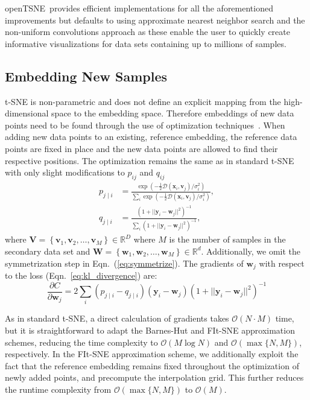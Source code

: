 \documentclass[twocolumn]{bmcart}
\newcommand{\opentsne}{\textsf{openTSNE}}
\begin{document}
\opentsne\ provides efficient implementations for all the aforementioned improvements but defaults to using approximate nearest neighbor search and the non-uniform convolutions approach as these enable the user to quickly create informative visualizations for data sets containing up to millions of samples.

\subsection*{Embedding New Samples}

t-SNE is non-parametric and does not define an explicit mapping from the high-dimensional space to the embedding space. Therefore embeddings of new data points need to be found through the use of optimization techniques~\cite{policar2019embedding}. When adding new data points to an existing, reference embedding, the reference data points are fixed in place and the new data points are allowed to find their respective positions. The optimization remains the same as in standard t-SNE with only slight modifications to $p_{ij}$ and $q_{ij}$
\begin{align}
p_{j \mid i} &= \frac{\exp \left ( -\frac{1}{2} \mathcal{D}(\mathbf{x}_i, \mathbf{v}_j) /  \sigma_i^2 \right )}{\sum_{i} \exp \left ( -\frac{1}{2} \mathcal{D}(\mathbf{x}_i, \mathbf{v}_j) / \sigma_i^2 \right )}, \\
q_{j \mid i} &= \frac{\left ( 1 + || \mathbf{y}_i - \mathbf{w}_j ||^2 \right )^{-1}}{\sum_{i}\left ( 1 + || \mathbf{y}_i - \mathbf{w}_j ||^2 \right )^{-1}},
\end{align}
\noindent where $\mathbf{V} = \left \{ \mathbf{v}_1, \mathbf{v}_2, \dots,
\mathbf{v}_M \right \} \in \mathbb{R}^D$ where $M$ is the number of samples in
the secondary data set and $\mathbf{W} = \left \{ \mathbf{w}_1, \mathbf{w}_2, \dots,
\mathbf{w}_M \right \} \in \mathbb{R}^d$. Additionally, we omit the
symmetrization step in Eqn.~(\ref{eq:symmetrize}). The gradients of
$\mathbf{w}_j$ with respect to the loss (Eqn.~\ref{eq:kl_divergence}) are:
\begin{equation}
\frac{\partial C}{\partial \mathbf{w}_j} = 2 \sum_i \left ( p_{j \mid i} - q_{j \mid i} \right ) \left ( \mathbf{y}_i - \mathbf{w}_j \right ) \left ( 1 + || \mathbf{y}_i - \mathbf{w}_j || ^2 \right )^{-1}
\label{eq:gradient}
\end{equation}

As in standard t-SNE, a direct calculation of gradients takes $\mathcal{O}(N \cdot M)$ time, but it is straightforward to adapt the Barnes-Hut and FIt-SNE approximation schemes, reducing the time complexity to $\mathcal{O}(M \log N)$ and $\mathcal{O}(\max \{ N, M \})$, respectively. In the FIt-SNE approximation scheme, we additionally exploit the fact that the reference embedding remains fixed throughout the optimization of newly added points, and precompute the interpolation grid. This further reduces the runtime complexity from $\mathcal{O}(\max \{ N, M \})$ to $\mathcal{O}(M)$.
\end{document}
